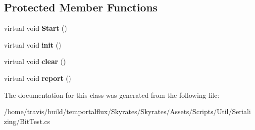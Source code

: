 \subsection*{Protected Member Functions}
\begin{DoxyCompactItemize}
\item 
\hypertarget{class_skyrates_1_1_util_1_1_serializing_1_1_test_1_1_bit_test_a9049e65133445a97d6707f4d5ef95e32}{virtual void {\bfseries Start} ()}\label{class_skyrates_1_1_util_1_1_serializing_1_1_test_1_1_bit_test_a9049e65133445a97d6707f4d5ef95e32}

\item 
\hypertarget{class_skyrates_1_1_util_1_1_serializing_1_1_test_1_1_bit_test_abb3f00f42c0fc28beb10cb0125700085}{virtual void {\bfseries init} ()}\label{class_skyrates_1_1_util_1_1_serializing_1_1_test_1_1_bit_test_abb3f00f42c0fc28beb10cb0125700085}

\item 
\hypertarget{class_skyrates_1_1_util_1_1_serializing_1_1_test_1_1_bit_test_a5f207ba6adac5f0df5bbc8cf7044d0cf}{virtual void {\bfseries clear} ()}\label{class_skyrates_1_1_util_1_1_serializing_1_1_test_1_1_bit_test_a5f207ba6adac5f0df5bbc8cf7044d0cf}

\item 
\hypertarget{class_skyrates_1_1_util_1_1_serializing_1_1_test_1_1_bit_test_aef6e4e6d8d803167407a940c45881ed1}{virtual void {\bfseries report} ()}\label{class_skyrates_1_1_util_1_1_serializing_1_1_test_1_1_bit_test_aef6e4e6d8d803167407a940c45881ed1}

\end{DoxyCompactItemize}


The documentation for this class was generated from the following file\-:\begin{DoxyCompactItemize}
\item 
/home/travis/build/temportalflux/\-Skyrates/\-Skyrates/\-Assets/\-Scripts/\-Util/\-Serializing/Bit\-Test.\-cs\end{DoxyCompactItemize}
